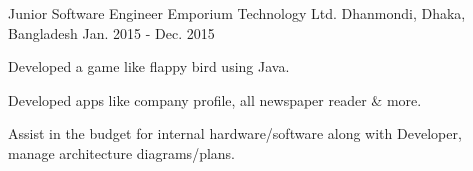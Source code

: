 \begin{cventries}
  \cventry
    {Junior Software Engineer} %
    {Emporium Technology Ltd.} %
    {Dhanmondi, Dhaka, Bangladesh} %
    {Jan. 2015 - Dec. 2015} %
    {
      \begin{cvitems} %
        \item {Developed a game like flappy bird using Java.}
        \item {Developed apps like company profile, all newspaper reader \& more.}
        \item {Assist in the budget for internal hardware/software along with Developer, manage architecture diagrams/plans.}
      \end{cvitems}
    }

\end{cventries}